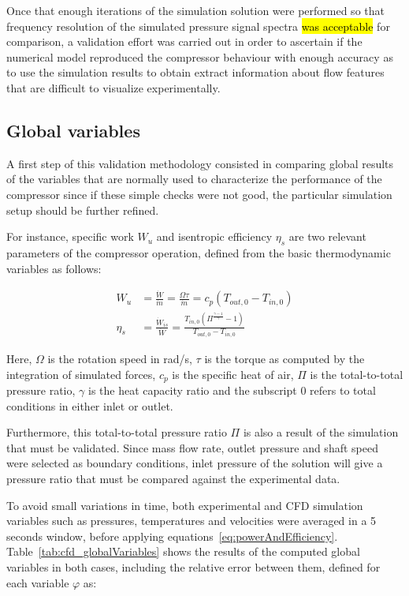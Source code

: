 Once that enough iterations of the simulation solution were performed so that frequency resolution of the simulated pressure signal spectra \hl{was acceptable} for comparison, a validation effort was carried out in order to ascertain if the numerical model reproduced the compressor behaviour with enough accuracy as to use the simulation results to obtain extract information about flow features that are difficult to visualize experimentally.   

\subsection{Global variables}

A first step of this validation methodology consisted in comparing global results of the variables that are normally used to characterize the performance of the compressor since if these simple checks were not good, the particular simulation setup should be  further refined.

For instance, specific work $W_u$ and isentropic efficiency $\eta_s$ are two relevant parameters of the compressor operation, defined from the basic thermodynamic variables as follows:

\begin{align}\label{eq:powerAndEfficiency}
W_u&=\frac{\dot{W}}{\dot{m}}=\frac{\Omega\tau}{\dot{m}}=c_p(T_{out,0}-T_{in,0}) \nonumber \\
\eta_s &= \frac{\dot{W}_{is}}{\dot{W}}=\frac{T_{in,0}\left(\varPi^\frac{\gamma-1}{\gamma}-1\right)}{T_{out,0}-T_{in,0}}
\end{align}

Here, $\Omega$ is the rotation speed in rad/s, $\tau$ is the torque as computed by the integration of simulated forces, $c_p$ is the specific heat of air, $\varPi$ is the total-to-total pressure ratio, $\gamma$ is the heat capacity ratio and the subscript 0 refers to total conditions in either inlet or outlet.

Furthermore, this total-to-total pressure ratio $\varPi$ is also a result of the simulation that must be validated. Since mass flow rate, outlet pressure and shaft speed were selected as boundary conditions, inlet pressure of the solution will give a pressure ratio that must be compared against the experimental data. 

To avoid small variations in time, both experimental and CFD simulation variables such as pressures, temperatures and velocities were averaged in a 5 seconds window, before applying equations~\ref{eq:powerAndEfficiency}. Table~\ref{tab:cfd_globalVariables} shows the results of the computed global variables in both cases, including the relative error between them, defined for each variable $\varphi$ as:

